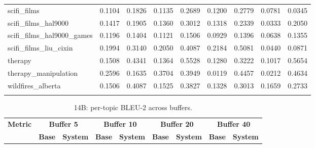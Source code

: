 \begin{landscape}
\begin{longtable}{@{}p{3.8cm}cccccccc@{}}
scifi\_films & 0.1104 & 0.1826 & 0.1135 & 0.2689 & 0.1200 & 0.2779 & 0.0781 & 0.0345 \\
scifi\_films\_hal9000 & 0.1417 & 0.1905 & 0.1360 & 0.3012 & 0.1318 & 0.2339 & 0.0333 & 0.2050 \\
scifi\_films\_hal9000\_games & 0.1196 & 0.1404 & 0.1121 & 0.1506 & 0.0929 & 0.1396 & 0.0638 & 0.1355 \\
scifi\_films\_liu\_cixin & 0.1994 & 0.3140 & 0.2050 & 0.4087 & 0.2184 & 0.5081 & 0.0440 & 0.0871 \\
therapy & 0.1508 & 0.4341 & 0.1364 & 0.5528 & 0.1280 & 0.3222 & 0.1017 & 0.5654 \\
therapy\_manipulation & 0.2596 & 0.1635 & 0.3704 & 0.3949 & 0.0119 & 0.4457 & 0.0212 & 0.4634 \\
wildfires\_alberta & 0.1506 & 0.4087 & 0.1525 & 0.3827 & 0.1328 & 0.3013 & 0.1659 & 0.2733 \\
\botrule
\end{longtable}
\begin{longtable}{@{}p{3.8cm}cccccccc@{}}
\caption{14B: per-topic BLEU-2 across buffers.}\label{tab:app_14b_bleu_topics}\\

\toprule
\textbf{Metric} & \multicolumn{2}{c}{\textbf{Buffer 5}} & \multicolumn{2}{c}{\textbf{Buffer 10}} & \multicolumn{2}{c}{\textbf{Buffer 20}} & \multicolumn{2}{c}{\textbf{Buffer 40}} \\
\cmidrule(lr){2-3}\cmidrule(lr){4-5}\cmidrule(lr){6-7}\cmidrule(lr){8-9}
 & \textbf{Base} & \textbf{System} & \textbf{Base} & \textbf{System} & \textbf{Base} & \textbf{System} & \textbf{Base} & \textbf{System} \\
\midrule
\endfirsthead


\end{longtable}
\end{landscape}
